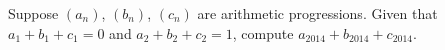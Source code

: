 Suppose $(a_n)$, $(b_n)$, $(c_n)$ are arithmetic progressions. Given that $a_1+b_1+c_1 = 0$ and $a_2+b_2+c_2 = 1$, compute $a_{2014}+b_{2014}+c_{2014}$.
